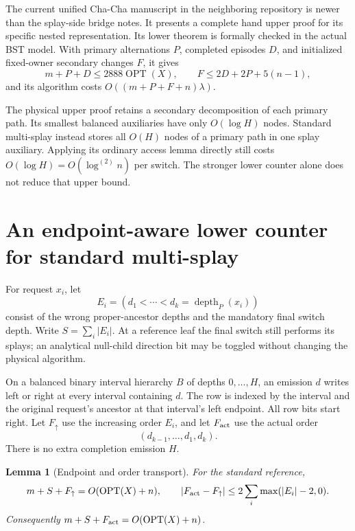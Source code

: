 \documentclass[11pt]{article}
\newtheorem{lemma}[theorem]{Lemma}
\newcommand{\OPT}{\operatorname{OPT}}
\newcommand{\lgit}[1]{\log^{(#1)}}
\begin{document}
The current unified Cha-Cha manuscript in the neighboring
repository is newer than the splay-side bridge notes. It presents a
complete hand upper proof for its specific nested representation.
Its lower theorem is formally checked in the actual BST model. With
primary alternations $P$, completed episodes $D$, and initialized
fixed-owner secondary changes $F$, it gives
\[
 m+P+D\le2888\OPT(X),\qquad
 F\le2D+2P+5(n-1),
\]
and its algorithm costs $O((m+P+F+n)\lambda)$.

The physical upper proof retains a secondary decomposition of each
primary path. Its smallest balanced auxiliaries have only
$O(\log H)$ nodes. Standard multi-splay instead stores all $O(H)$
nodes of a primary path in one splay auxiliary. Applying its ordinary
access lemma directly still costs $O(\log H)=O(\lgit{2}n)$ per switch.
The stronger lower counter alone does not reduce that upper bound.

\section{An endpoint-aware lower counter for standard multi-splay}

For request $x_i$, let
\[
 E_i=(d_1<\cdots<d_k=\operatorname{depth}_P(x_i))
\]
consist of the wrong proper-ancestor depths and the mandatory final
switch depth. Write $S=\sum_i|E_i|$. At a reference leaf the final
switch still performs its splays; an analytical null-child direction
bit may be toggled without changing the physical algorithm.

On a balanced binary interval hierarchy $B$ of depths $0,\ldots,H$,
an emission $d$ writes left or right at every interval containing $d$.
The row is indexed by the interval and the original request's ancestor
at that interval's left endpoint. All row bits start right. Let
$F_\uparrow$ use the increasing order $E_i$, and let $F_{\rm act}$
use the actual order
\[
 (d_{k-1},\ldots,d_1,d_k).
\]
There is no extra completion emission $H$.

\begin{lemma}[Endpoint and order transport]\label{lem:counter}
For the standard reference,
\[
 m+S+F_\uparrow=O(\OPT(X)+n),\qquad
 |F_{\rm act}-F_\uparrow|
 \le2\sum_i\max(|E_i|-2,0).
\]
Consequently $m+S+F_{\rm act}=O(\OPT(X)+n)$.
\end{lemma}
\end{document}

